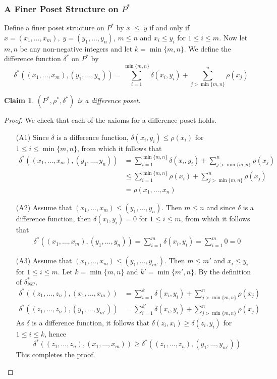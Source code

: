 \documentclass[acmsmall,review,anonymous]{acmart}\settopmatter{printfolios=true,printccs=false,printacmref=false}
\newtheorem{claim}{Claim}
\begin{document}
\subsubsection{A Finer Poset Structure on $P^*$}
Define a finer poset structure on $P^*$ by $x \; \leq \; y$
if and only if $x = (x_1, \ldots, x_m), \; y = (y_1, \ldots, y_n)$, $m \leq n$
and $x_i \leq y_i$ for $1 \leq i \leq m$. Now let $m, n$ be any non-negative
integers and let $k = \min\{m, n\}$. We define the difference function
$\delta^*$ on $P^*$ by
$$\delta^*((x_1, \ldots, x_m), (y_1, \ldots, y_n)) =
\sum_{i=1}^{\min\{m, n\}} \delta(x_i, y_i) + \sum_{j > \min\{m, n\}}^n \rho(x_j)
$$
\begin{claim}
$(P^*, \rho^*, \delta^*)$ is a difference poset.
\end{claim}
\begin{proof}
We check that each of the axioms for a difference poset holds.
\begin{enumerate}
  \item[(A1)]
  Since $\delta$ is a difference function, $\delta(x_i, y_i)
  \leq \rho(x_i)$ for $1 \leq i \leq \min\{m, n\}$, from which it follows that
  \begin{align*}
\delta^*((x_1, \ldots, x_m), (y_1, \ldots, y_n)) &=
\sum_{i=1}^{\min\{m, n\}} \delta(x_i, y_i) + \sum_{j > \min\{m, n\}}^n
\rho(x_j)\\
&\leq  \sum_{i=1}^{\min\{m, n\}} \rho(x_i) + \sum_{j > \min\{m, n\}}^n
\rho(x_j)\\
&= \rho(x_1, \ldots, x_n)
\end{align*}
\item[(A2)]
Assume that $(x_1, \ldots, x_m) \leq (y_1, \ldots, y_n)$. Then $m \leq
n$ and since $\delta$ is a difference function, then $\delta(x_i, y_i) = 0$
for $1 \leq i \leq m$, from which it follows that
\begin{align*}
\delta^*((x_1, \ldots, x_m), (y_1, \ldots, y_n)) = \sum_{i=1}^m \delta(x_i,
y_i) = \sum_{i=1}^m 0 = 0
\end{align*}
\item[(A3)]
Assume that $(x_1, \ldots, x_m) \leq (y_1, \ldots, y_{m'})$. Then $m \leq
m'$ and $x_i \leq y_i$ for $1 \leq i \leq m$. Let $k = \min\{m, n\}$ and $k' =
\min\{m', n\}$. By the definition of $\delta_{NC}^*$,
\begin{align*}
\delta^*((z_1, \ldots, z_n), (x_1, \ldots, x_m)) &= \sum_{i=1}^{k} \delta(x_i,
y_i) + \sum_{j > \min\{m, n\}}^n \rho(x_j)\\
\delta^*((z_1, \ldots, z_n), (y_1, \ldots, y_{m'})) &= \sum_{i=1}^{k'}
\delta(x_i, y_i) + \sum_{j > \min\{m, n\}}^n \rho(x_j)
\end{align*}
As $\delta$ is a difference function, it follows that $\delta(z_i, x_i) \geq
\delta(z_i, y_i)$ for $1 \leq i \leq k$, hence
$$\delta^*((z_1, \ldots, z_n), (x_1, \ldots, x_m)) \geq \delta^*((z_1,
\ldots, z_n), (y_1, \ldots, y_{m'}))$$
This completes the proof.
\end{enumerate}
\end{proof}
\end{document}

